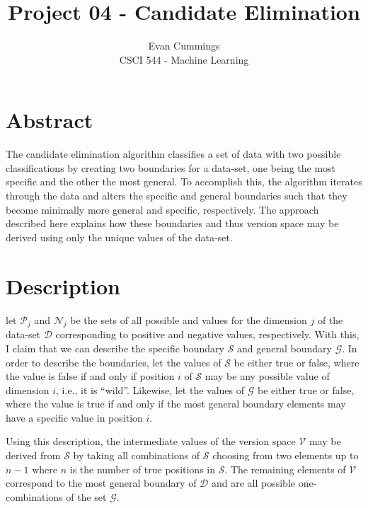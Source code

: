 
\DeclareMathOperator*{\argmax}{arg\,max}

\usepackage[top=.5in, bottom=.5in, left=.5in, right=.5in]{geometry}
\usepackage{natbib}


\small

\title{Project 04 - Candidate Elimination}
\author{Evan Cummings\\
CSCI 544 - Machine Learning}

\maketitle

\section*{Abstract}

The candidate elimination algorithm classifies a set of data with two possible classifications by creating two boundaries for a data-set, one being the most specific and the other the most general.  To accomplish this, the algorithm iterates through the data and alters the specific and general boundaries such that they become minimally more general and specific, respectively.  The approach described here explains how these boundaries and thus version space may be derived using only the unique values of the data-set.

\section*{Description}

let $\mathcal{P}_j$ and $\mathcal{N}_j$ be the sets of all possible and values for the dimension $j$ of the data-set $\mathcal{D}$ corresponding to positive and negative values, respectively.  With this, I claim that we can describe the specific boundary $\mathcal{S}$ and general boundary $\mathcal{G}$.  In order to describe the boundaries, let the values of $\mathcal{S}$ be either true or false, where the value is false if and only if position $i$ of $\mathcal{S}$ may be any possible value of dimension $i$, i.e., it is ``wild''.  Likewise, let the values of $\mathcal{G}$ be either true or false, where the value is true if and only if the most general boundary elements may have a specific value in position $i$.

Using this description, the intermediate values of the version space $\mathcal{V}$ may be derived from $\mathcal{S}$ by taking all combinations of $\mathcal{S}$ choosing from two elements up to $n-1$ where $n$ is the number of true positions in $\mathcal{S}$.  The remaining elements of $\mathcal{V}$ correspond to the most general boundary of $\mathcal{D}$ and are all possible one-combinations of the set $\mathcal{G}$.

